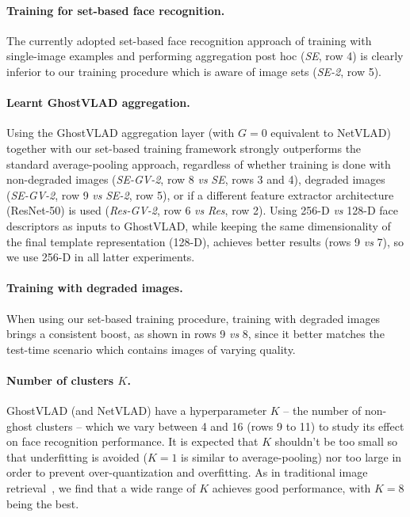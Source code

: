 \documentclass[runningheads]{llncs}
\newcommand{\vs}{\emph{vs }}
\begin{document}

\paragraph{Training for set-based face recognition.}
The currently adopted set-based face recognition approach
of training with single-image examples
and performing aggregation post hoc (\emph{SE}, row 4)
is clearly inferior to
our training procedure which is aware of image sets
(\emph{SE-2}, row 5).


\paragraph{Learnt GhostVLAD aggregation.}
Using the GhostVLAD aggregation layer
(with $G=0$ \ie equivalent to NetVLAD)
together with our set-based training framework strongly outperforms
the standard average-pooling approach,
regardless of whether training is done with non-degraded images
(\emph{SE-GV-2}, row 8 \vs \emph{SE}, rows 3 and 4),
degraded images
(\emph{SE-GV-2}, row 9 \vs \emph{SE-2}, row 5),
or if a different feature extractor architecture (ResNet-50)
is used (\emph{Res-GV-2}, row 6 \vs \emph{Res}, row 2).
Using 256-D \vs 128-D face descriptors as inputs to GhostVLAD,
while keeping the same dimensionality of the final template representation
(128-D),
achieves better results (rows 9 \vs 7),
so we use 256-D in all latter experiments.

\paragraph{Training with degraded images.}
When using our set-based training procedure,
training with degraded images brings a consistent boost,
as shown in rows 9 \vs 8, since it better matches the test-time
scenario which contains images of varying quality.



\paragraph{Number of clusters $K$.}
GhostVLAD (and NetVLAD) have a hyperparameter $K$
-- the number of non-ghost clusters -- which we vary
between 4 and 16 (rows 9 to 11) to study its effect on
face recognition performance.
It is expected that $K$ shouldn't be too small
so that underfitting is avoided
(\eg $K=1$ is similar to average-pooling)
nor too large in order to prevent over-quantization and overfitting.
As in traditional image retrieval~\cite{Jegou10},
we find that a wide range of $K$ achieves good performance,
with $K=8$ being the best.
\end{document}

